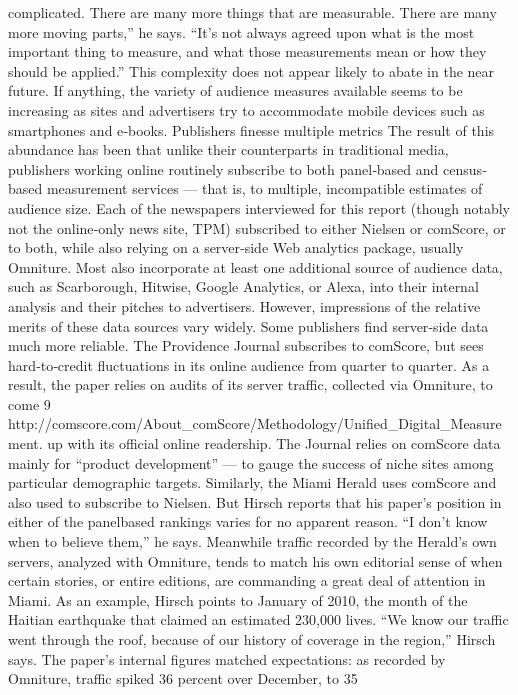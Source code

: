 complicated. There are many more things that are measurable. There are
many more moving parts,'' he says. ``It’s not always agreed upon what is
the most important thing to measure, and what those measurements mean
or how they should be applied.''
This complexity does not appear likely to abate in the near future. If
anything, the variety of audience measures available seems to be
increasing as sites and advertisers try to accommodate mobile devices
such as smartphones and e‐books.
Publishers finesse multiple metrics
The result of this abundance has been that unlike their counterparts in
traditional media, publishers working online routinely subscribe to both
panel‐based and census‐based measurement services — that is, to
multiple, incompatible estimates of audience size. Each of the newspapers
interviewed for this report (though notably not the online‐only news site,
TPM) subscribed to either Nielsen or comScore, or to both, while also
relying on a server‐side Web analytics package, usually Omniture. Most
also incorporate at least one additional source of audience data, such as
Scarborough, Hitwise, Google Analytics, or Alexa, into their internal
analysis and their pitches to advertisers.
However, impressions of the relative merits of these data sources vary
widely. Some publishers find server‐side data much more reliable. The
Providence Journal subscribes to comScore, but sees hard‐to‐credit
fluctuations in its online audience from quarter to quarter. As a result, the
paper relies on audits of its server traffic, collected via Omniture, to come
9 http://comscore.com/About_comScore/Methodology/Unified_Digital_Measurement.
up with its official online readership. The Journal relies on comScore data
mainly for ``product development'' — to gauge the success of niche sites
among particular demographic targets.
Similarly, the Miami Herald uses comScore and also used to subscribe to
Nielsen. But Hirsch reports that his paper’s position in either of the panelbased
rankings varies for no apparent reason. ``I don’t know when to
believe them,'' he says. Meanwhile traffic recorded by the Herald’s own
servers, analyzed with Omniture, tends to match his own editorial sense
of when certain stories, or entire editions, are commanding a great deal of
attention in Miami.
As an example, Hirsch points to January of 2010, the month of the Haitian
earthquake that claimed an estimated 230,000 lives. ``We know our traffic
went through the roof, because of our history of coverage in the region,''
Hirsch says. The paper’s internal figures matched expectations: as
recorded by Omniture, traffic spiked 36 percent over December, to 35
